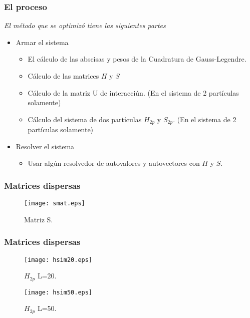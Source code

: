 \documentclass{beamer}
\begin{document}
\begin{frame}
  \frametitle{El proceso}
  \textit{El m\'etodo que se optimiz\'o tiene las siguientes partes}
  \begin{itemize}
    \item {Armar el sistema
      \begin{itemize}
        \item El c\'alculo de las abscisas y pesos de la Cuadratura de Gauss-Legendre.
        \item C\'alculo de las matrices $H$ y $S$
        \item C\'alculo de la matriz U de interacci\'un. (En el sistema de 2 part\'iculas solamente)
        \item C\'alculo del sistema de dos part\'iculas $H_{2p}$ y $S_{2p}$. (En el sistema de 2 part\'iculas solamente)
      \end{itemize}}
    \item {Resolver el sistema
  \begin{itemize}
    \item Usar alg\'un resolvedor de autovalores y autovectores con $H$ y $S$.
  \end{itemize}
  }
  \end{itemize}
\end{frame}


\begin{frame}
  \frametitle{Matrices dispersas}
  \begin{figure}[!tbp]
    \centering
    \texttt{[image: smat.eps]}
    \caption{Matriz S.}
  \end{figure}
\end{frame}



\begin{frame}
  \frametitle{Matrices dispersas}
  \begin{figure}[!tbp]
    \centering
    \begin{minipage}[b]{0.4\textwidth}
      \texttt{[image: hsim20.eps]}
      \caption{$H_{2p}$ L=20.}
    \end{minipage}
    \hfill
    \begin{minipage}[b]{0.5\textwidth}
        \texttt{[image: hsim50.eps]}
        \caption{$H_{2p}$ L=50.}
    \end{minipage}
  \end{figure}

\end{frame}
\end{document}
